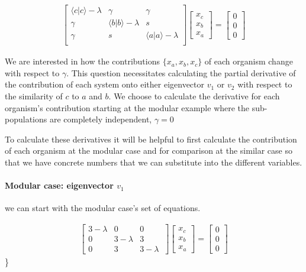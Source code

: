 \documentclass[
  letterpaper,
  DIV=11,
  numbers=noendperiod]{scrartcl}
\let\oldparagraph\paragraph
\renewcommand{\paragraph}[1]{\oldparagraph{#1}\mbox{}}
\begin{document}
\begin{align*}
\begin{bmatrix}
    \langle c|c \rangle-\lambda&\gamma&\gamma\\
    \gamma&\langle b|b \rangle-\lambda&s\\
    \gamma&s&\langle a|a \rangle-\lambda\\
\end{bmatrix}\begin{bmatrix}x_c\\x_b\\x_a\end{bmatrix}= \begin{bmatrix}0\\0\\0\end{bmatrix}
\end{align*}

We are interested in how the contributions \(\{x_a, x_b, x_c\}\) of each
organism change with respect to \(\gamma\). This question necessitates
calculating the partial derivative of the contribution of each system
onto either eigenvector \(v_1\) or \(v_2\) with respect to the
similarity of \(c\) to \(a\) and \(b\). We choose to calculate the
derivative for each organism's contribution starting at the modular
example where the sub-populations are completely independent,
\(\gamma = 0\)

To calculate these derivatives it will be helpful to first calculate the
contribution of each organism at the modular case and for comparison at
the similar case so that we have concrete numbers that we can substitute
into the different variables.

\hypertarget{modular-case-eigenvector-v_1}{%
\paragraph{\texorpdfstring{Modular case: eigenvector
\(v_1\)}{Modular case: eigenvector v\_1}}\label{modular-case-eigenvector-v_1}}

we can start with the modular case's set of equations.

\begin{align*}
\begin{bmatrix}
    3-\lambda&0&0\\
    0&3-\lambda&3\\
    0&3&3-\lambda\
\end{bmatrix}\begin{bmatrix}x_c\\x_b\\x_a\end{bmatrix}= \begin{bmatrix}0\\0\\0\end{bmatrix}
\end{align*}\}
\end{document}
